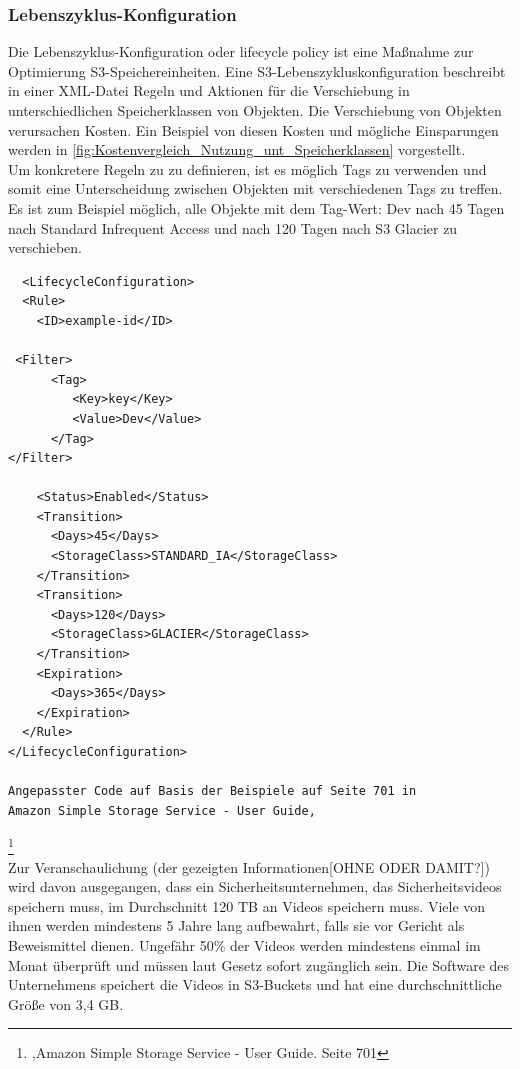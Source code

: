 \subsubsection{Lebenszyklus-Konfiguration}
Die Lebenszyklus-Konfiguration oder lifecycle policy ist eine Maßnahme zur Optimierung S3-Speichereinheiten. Eine S3-Lebenszykluskonfiguration beschreibt in einer XML-Datei Regeln und Aktionen für die Verschiebung in unterschiedlichen Speicherklassen von Objekten. Die Verschiebung von Objekten verursachen Kosten. Ein Beispiel von diesen Kosten und mögliche Einsparungen werden in \autoref{fig:Kostenvergleich_Nutzung_unt_Speicherklassen} vorgestellt.
\\
Um konkretere Regeln zu zu definieren, ist es möglich Tags zu verwenden und somit eine Unterscheidung zwischen Objekten mit verschiedenen Tags zu treffen. Es ist zum Beispiel möglich, alle Objekte mit dem Tag-Wert: Dev nach 45 Tagen nach Standard Infrequent Access und nach 120 Tagen nach S3 Glacier zu verschieben.
\begin{lstlisting}
  <LifecycleConfiguration>
  <Rule>
    <ID>example-id</ID>
    
 <Filter>
      <Tag>
         <Key>key</Key>
         <Value>Dev</Value>
      </Tag>
</Filter>

    <Status>Enabled</Status>
    <Transition>
      <Days>45</Days>
      <StorageClass>STANDARD_IA</StorageClass>
    </Transition>
    <Transition>
      <Days>120</Days>
      <StorageClass>GLACIER</StorageClass>
    </Transition>
    <Expiration>
      <Days>365</Days>
    </Expiration>
  </Rule>
</LifecycleConfiguration>

Angepasster Code auf Basis der Beispiele auf Seite 701 in 
Amazon Simple Storage Service - User Guide, 
\end{lstlisting}
\footnote{\cite{AMZ18},Amazon Simple Storage Service - User Guide. Seite 701}\\
Zur Veranschaulichung (der gezeigten Informationen[OHNE ODER DAMIT?]) wird davon ausgegangen, dass ein Sicherheitsunternehmen, das Sicherheitsvideos speichern muss, im Durchschnitt 120 TB an Videos speichern muss. Viele von ihnen werden mindestens 5 Jahre lang aufbewahrt, falls sie vor Gericht als Beweismittel dienen. Ungefähr 50\% der Videos werden mindestens einmal im Monat überprüft und müssen laut Gesetz sofort zugänglich sein. Die Software des Unternehmens speichert die Videos in S3-Buckets und hat eine durchschnittliche Größe von 3,4 GB.

